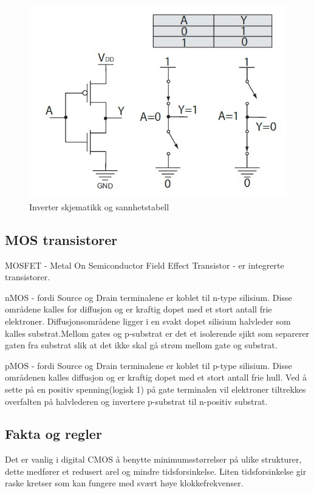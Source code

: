 \documentclass{article}
\begin{document}
	\begin{figure}[H]
		\includegraphics[scale = 0.6]{CMOSinv.jpg}
		\caption{Inverter skjematikk og sannhetstabell}
	\end{figure}
		
	\subsection{MOS transistorer}
	MOSFET - Metal On Semiconductor Field Effect Transistor - er integrerte transistorer.
	
	nMOS - fordi Source og Drain terminalene er koblet til n-type silisium.
	Disse områdene kalles for diffusjon og er kraftig dopet med et stort antall frie elektroner. Diffusjonsområdene ligger i en svakt dopet silisium halvleder som kalles substrat.Mellom gates og p-substrat er det et isolerende sjikt som separerer gaten fra substrat slik at det ikke skal gå strøm mellom gate og substrat.
	
	pMOS - fordi Source og Drain terminalene er koblet til p-type silisium. Disse områdenen kalles diffusjon og er kraftig dopet med et stort antall frie hull. Ved å sette på en positiv spenning(logisk 1) på gate terminalen vil elektroner tiltrekkes overfalten på halvlederen og invertere p-substrat til n-positiv substrat.
	
	\subsection{Fakta og regler}
	
	Det er vanlig i digital CMOS å benytte minimumsstørrelser på ulike strukturer, dette medfører et redusert arel og mindre tidsforsinkelse. Liten tidsforsinkelse gir raske kretser som kan fungere med svært høye klokkefrekvenser.
	
\end{document}
